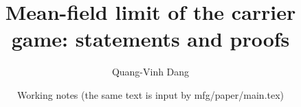 \documentclass[11pt]{article}
\title{Mean-field limit of the carrier game: statements and proofs}
\author{Quang-Vinh Dang}
\date{Working notes (the same text is input by mfg/paper/main.tex)}
\begin{document}
\maketitle
\label{sec:comp}\label{sec:exp}







\end{document}
